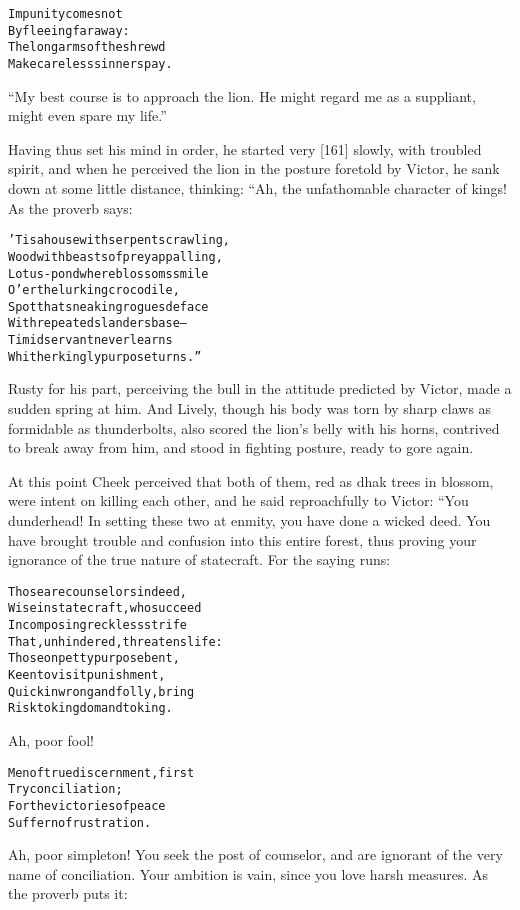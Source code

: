 \documentclass{article}
\renewenvironment{verbatim}{\begin{alltt}\normalfont\begin{centering}}{\end{centering}\end{alltt}}
\begin{document}
\begin{verbatim}
Impunity comes not
    By fleeing far away:
The long arms of the shrewd
    Make careless sinners pay.
\end{verbatim}
``My best course is to approach the lion. He might regard me as a suppliant, might even spare my life.''

Having thus set his mind in order, he started very [161] slowly,
with troubled spirit, and when he perceived the lion in the posture
foretold by Victor, he sank down at some little distance, thinking:
“Ah, the unfathomable character of kings! As the proverb says:

\begin{verbatim}
'Tis a house with serpents crawling,
Wood with beasts of prey appalling,
Lotus-pond where blossoms smile
O'er the lurking crocodile,
Spot that sneaking rogues deface
With repeated slanders base--
Timid servant never learns
Whither kingly purpose turns.”
\end{verbatim}
Rusty for his part, perceiving the bull in the attitude predicted
by Victor, made a sudden spring at him. And Lively, though his body
was torn by sharp claws as formidable as thunderbolts, also scored
the lion's belly with his horns, contrived to break away from him,
and stood in fighting posture, ready to gore again.

At this point Cheek perceived that both of them, red as dhak trees
in blossom, were intent on killing each other, and he said
reproachfully to Victor: “You dunderhead! In setting these two at
enmity, you have done a wicked deed. You have brought trouble and
confusion into this entire forest, thus proving your ignorance of
the true nature of statecraft. For the saying runs:

\begin{verbatim}
Those are counselors indeed,
Wise in statecraft, who succeed
In composing reckless strife
That, unhindered, threatens life:
Those on petty purpose bent,
Keen to visit punishment,
Quick in wrong and folly, bring
Risk to kingdom and to king.
\end{verbatim}
Ah, poor fool!

\begin{verbatim}
Men of true discernment, first
    Try conciliation;
For the victories of peace
    Suffer no frustration.
\end{verbatim}
Ah, poor simpleton! You seek the post of counselor, and are
ignorant of the very name of conciliation. Your ambition is vain,
since you love harsh measures. As the proverb puts it:
\end{document}
